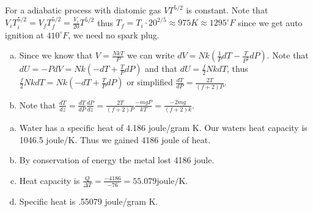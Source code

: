 \documentclass[12pt]{article}
\makeatletter
\theoremstyle{homework}
\newenvironment{exercise}[1]
{\def\@currentlabel{#1}\exercisecore}
{\endexercisecore}
\makeatother
\begin{document}
\begin{exercise}{1.37}
For a adiabatic process with diatomic gas $VT^{5/2}$ is constant.  Note that $V_iT_i^{5/2}=V_fT_f^{5/2}=\frac{V_i}{20}T^{5/2}$ thus $T_f=T_i\cdot 20^{2/5}\approx 975K\approx 1295^\circ F$ since we get auto ignition at $410^\circ F$, we need no spark plug.
\end{exercise}
\begin{exercise}{1.40}
\begin{enumerate}[(a)]
\item
Since we know that $V=\frac{NkT}{P}$ we can write $dV=Nk(\frac{1}{P} dT-\frac{T}{P^2}dP)$.  Note that $dU=-PdV=Nk(-dT+\frac{T}{P}dP)$ and that $dU=\frac{f}{2} NkdT$, thus $\frac{f}{2} NkdT=Nk(-dT+\frac{T}{P}dP)$ or simplified $\frac{dT}{dP}=\frac{2T}{(f+2)P}$.
\item
Note that $\frac{dT}{dz}=\frac{dT}{dP} \frac{dP}{dz}=\frac{2T}{(f+2)P} \frac{-mgP}{kT}=\frac{-2mg}{(f+2)k}$.
\end{enumerate}
\end{exercise}
\begin{exercise}{1.41}
\begin{enumerate}[(a)]
\item
Water has a specific heat of 4.186 joule/gram K.  Our waters heat capacity is 1046.5 joule/K.  Thus we gained 4186 joule of heat.
\item
By conservation of energy the metal lost 4186 joule.
\item
Heat capacity is $\frac{Q}{\Delta T}=\frac{-4186}{-76}=55.079\text{joule/K}$.
\item
Specific heat is .55079 joule/gram K.
\end{enumerate}

\end{exercise}
\end{document}
